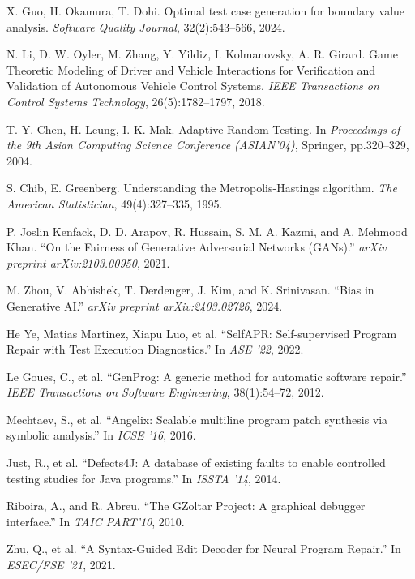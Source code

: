 \documentclass[manuscript,screen,review]{acmart}
\begin{document}
\begin{thebibliography}{99}

X. Guo, H. Okamura, T. Dohi. Optimal test case generation for boundary value analysis. \textit{Software Quality Journal}, 32(2):543--566, 2024.

N. Li, D. W. Oyler, M. Zhang, Y. Yildiz, I. Kolmanovsky, A. R. Girard. Game Theoretic Modeling of Driver and Vehicle Interactions for Verification and Validation of Autonomous Vehicle Control Systems. \textit{IEEE Transactions on Control Systems Technology}, 26(5):1782--1797, 2018.

T. Y. Chen, H. Leung, I. K. Mak. Adaptive Random Testing. In \textit{Proceedings of the 9th Asian Computing Science Conference (ASIAN’04)}, Springer, pp.320--329, 2004.

S. Chib, E. Greenberg. Understanding the Metropolis-Hastings algorithm. \textit{The American Statistician}, 49(4):327--335, 1995.

P. Joslin Kenfack, D. D. Arapov, R. Hussain, S. M. A. Kazmi, and A. Mehmood Khan. ``On the Fairness of Generative Adversarial Networks (GANs).'' \textit{arXiv preprint arXiv:2103.00950}, 2021.

M. Zhou, V. Abhishek, T. Derdenger, J. Kim, and K. Srinivasan. ``Bias in Generative AI.'' \textit{arXiv preprint arXiv:2403.02726}, 2024.

He Ye, Matias Martinez, Xiapu Luo, et al. ``SelfAPR: Self-supervised Program Repair with Test Execution Diagnostics.'' In \textit{ASE '22}, 2022.

Le Goues, C., et al. ``GenProg: A generic method for automatic software repair.'' \textit{IEEE Transactions on Software Engineering}, 38(1):54--72, 2012.

Mechtaev, S., et al. ``Angelix: Scalable multiline program patch synthesis via symbolic analysis.'' In \textit{ICSE '16}, 2016.

Just, R., et al. ``Defects4J: A database of existing faults to enable controlled testing studies for Java programs.'' In \textit{ISSTA '14}, 2014.

Riboira, A., and R. Abreu. ``The GZoltar Project: A graphical debugger interface.'' In \textit{TAIC PART'10}, 2010.

Zhu, Q., et al. ``A Syntax-Guided Edit Decoder for Neural Program Repair.'' In \textit{ESEC/FSE '21}, 2021.


\end{thebibliography}
\end{document}
